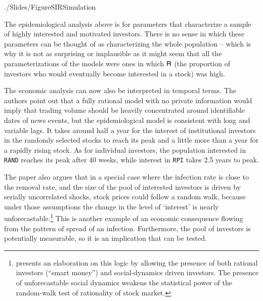 \begin{verbatimwrite}{./Slides/FigureSIRSimulation}
\begin{figure}
\begin{flushleft}
    \end{flushleft}
  \end{figure}
\end{verbatimwrite}%

The epidemiological analysis above is for parameters that characterize a sample of highly interested and motivated investors.  There is no sense in which these parameters can be thought of as characterizing the whole population -- which is why it is not as surprising or implausible as it might seem that all the parameterizations of the models were ones in which $\mathsf{R}$ (the proportion of investors who would eventually become interested in a stock) was high.

The economic analysis can now also be interpreted in temporal terms.  The authors point out that a fully rational model with no private information would imply that trading volume should be heavily concentrated around identifiable dates of news events, but the epidemiological model is consistent with long and variable lags.  It takes around half a year for the interest of institutional investors in the randomly selected stocks to reach its peak and a little more than a year for a rapidly rising stock. As for individual investors, the population interested in \texttt{RAND} reaches its peak after 40 weeks, while interest in \texttt{RPI} takes 2.5 years to peak.



The paper also argues that in a special case where the infection rate is close to the removal rate, and the size of the pool of interested investors is driven by serially uncorrelated shocks, stock prices could follow a random walk, because under those assumptions the change in the level of `interest' is nearly unforecastable.\footnote{\cite{shiller1984stock} presents an  elaboration on this logic by allowing the presence of both rational investors (``smart money'') and social-dynamics driven investors. The presence of unforecastable social dynamics weakens the statistical power of the random-walk test of rationality of stock market.} This is another example of an economic consequence flowing from the pattern of spread of an infection.  Furthermore, the pool of investors is potentially measurable, so it is an implication that can be tested.

